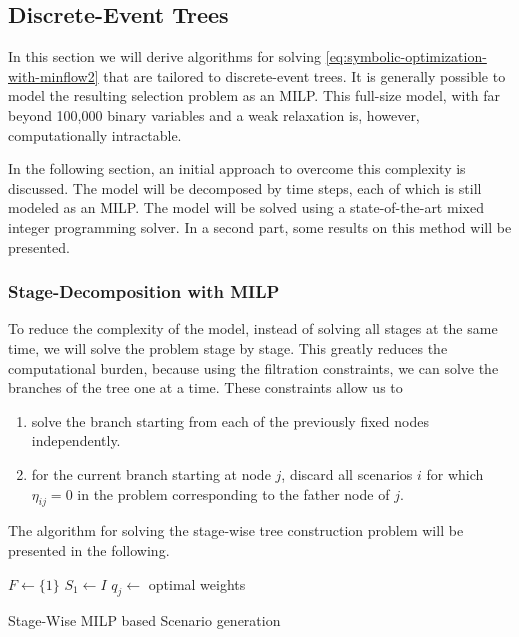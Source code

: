 \subsection{Discrete-Event Trees}
\label{sec:MILP-selection-problem}
In this section we will derive algorithms for solving \eqref{eq:symbolic-optimization-with-minflow2} that are tailored to discrete-event trees.
It is generally possible to model the resulting selection problem as an MILP. 
This full-size model, with far beyond 100,000 binary variables and a weak relaxation is, however, computationally intractable.

In the following section, an initial approach to overcome this complexity is discussed.
The model will be decomposed by time steps, each of which is still modeled as an MILP.
The model will be solved using a state-of-the-art mixed integer programming solver.
In a second part, some results on this method will be presented.
%
\subsubsection{Stage-Decomposition with MILP}
%
To reduce the complexity of the model, instead of solving all stages at the same time, we will solve the problem stage by stage.
This greatly reduces the computational burden, because using the filtration constraints, we can solve the branches of the tree one at a time.
These constraints allow us to 
\begin{enumerate}
\item solve the branch starting from each of the previously fixed nodes independently.
\item for the current branch starting at node $j$, discard all scenarios $i$ for which $\eta_{ij}=0$ in the problem corresponding to the father node of $j$.
\end{enumerate}

The algorithm for solving the stage-wise tree construction problem will be presented in the following.
\begin{algorithm}
  $F \leftarrow \{1\}$
  $S_1 \leftarrow I$
  $q_j\leftarrow $ optimal weights 
  \caption{Stage-Wise MILP based Scenario generation}
  \label{alg:stage-wise-milp}
\end{algorithm}

